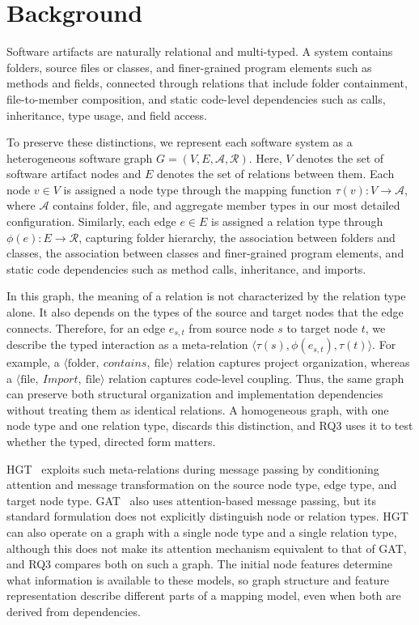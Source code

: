 \section{Background \label{sec:background}}

Software artifacts are naturally relational and multi-typed. A system contains folders, source files or classes, and finer-grained program elements such as methods and fields, connected through relations that include folder containment, file-to-member composition, and static code-level dependencies such as calls, inheritance, type usage, and field access.
 
To preserve these distinctions, we represent each software system as a heterogeneous software graph $G=(V, E,\mathcal{A},\mathcal{R})$. Here, $V$ denotes the set of software artifact nodes and $E$ denotes the set of relations between them. Each node $v \in V$ is assigned a node type through the mapping function $\tau(v): V \rightarrow \mathcal{A}$, where $\mathcal{A}$ contains folder, file, and aggregate member types in our most detailed configuration. Similarly, each edge $e \in E$ is assigned a relation type through $\phi(e): E \rightarrow \mathcal{R}$, capturing folder hierarchy, the association between folders and classes, the association between classes and finer-grained program elements, and static code dependencies such as method calls, inheritance, and imports.
 
In this graph, the meaning of a relation is not characterized by the relation type alone. It also depends on the types of the source and target nodes that the edge connects. Therefore, for an edge $e_{s,t}$ from source node $s$ to target node $t$, we describe the typed interaction as a meta-relation $\langle \tau(s), \phi(e_{s,t}), \tau(t) \rangle$. For example, a $\langle \text{folder},\ contains,\ \text{file} \rangle$ relation captures project organization, whereas a $\langle \text{file},\ Import,\ \text{file} \rangle$ relation captures code-level coupling. Thus, the same graph can preserve both structural organization and implementation dependencies without treating them as identical relations. A homogeneous graph, with one node type and one relation type, discards this distinction, and RQ3 uses it to test whether the typed, directed form matters.
 
HGT~\cite{hgt} exploits such meta-relations during message passing by conditioning attention and message transformation on the source node type, edge type, and target node type. GAT~\cite{gat} also uses attention-based message passing, but its standard formulation does not explicitly distinguish node or relation types. HGT can also operate on a graph with a single node type and a single relation type, although this does not make its attention mechanism equivalent to that of GAT, and RQ3 compares both on such a graph. The initial node features determine what information is available to these models, so graph structure and feature representation describe different parts of a mapping model, even when both are derived from dependencies.
 
